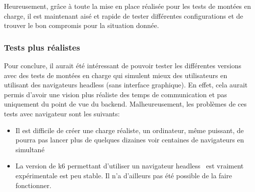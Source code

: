 Heureusement, grâce à toute la mise en place réalisée pour les tests de montées en charge, il est maintenant aisé et rapide de tester différentes configurations et de trouver le bon compromis pour la situation donnée.

\subsubsection{Tests plus réalistes}

Pour conclure, il aurait été intéressant de pouvoir tester les différentes versions avec des tests de montées en charge qui simulent mieux des utilisateurs en utilisant des navigateurs headless (sans interface graphique). En effet, cela aurait permis d'avoir une vision plus réaliste des temps de communication et pas uniquement du point de vue du backend. Malheureusement, les problèmes de ces tests avec navigateur sont les suivants:

\begin{itemize}
  \item Il est difficile de créer une charge réaliste, un ordinateur, même puissant, de pourra pas lancer plus de quelques dizaines voir centaines de navigateurs en simultané
  \item La version de k6 permettant d'utiliser un navigateur headless~\cite{k6-browser} est vraiment expérimentale est peu stable. Il n'a d'ailleurs pas été possible de la faire fonctionner.
\end{itemize}

